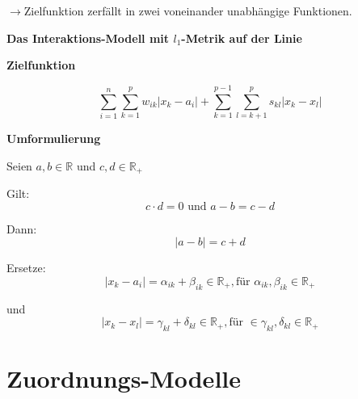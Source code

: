       $\rightarrow$Zielfunktion zerfällt in zwei voneinander unabhängige Funktionen.

      \par \textbf{Das Interaktions-Modell mit $l_1$-Metrik auf der Linie}

      \par \textbf{Zielfunktion}

      \begin{equation}
        \sum_{i=1}^{n}\sum_{k=1}^{p}w_{ik}|x_{k}-a_{i}| + \sum_{k=1}^{p-1}\sum_{l=k+1}^{p}s_{kl}|x_{k}-x_{l}|
      \end{equation}

      \par \textbf{Umformulierung}

      \begin{framed}
        \par Seien $a, b \in \mathbb{R}$ und $c, d \in \mathbb{R}_+$\\
        \par Gilt: 
        \[c \cdot d = 0 \text{ und } a - b = c - d\]
        \par Dann:
        \[|a - b| = c + d\]
        \par Ersetze:
        \[|x_k - a_i| = \alpha_{ik} + \beta_{ik} \in \mathbb{R}_+, \text{für } \alpha_{ik}, \beta_{ik} \in \mathbb{R}_+\]
        \par und 
        \[|x_k - x_l| = \gamma_{kl} + \delta_{kl} \in \mathbb{R}_+, \text{für } \in \gamma_{kl}, \delta_{kl} \in \mathbb{R}_+\]
      \end{framed}
      
    

    \section{Zuordnungs-Modelle} %
    \label{sub:zuordnungs_modelle}
    





